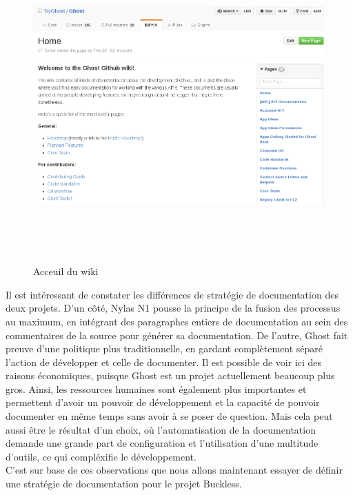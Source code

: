         \begin{figure}[h]
            \centering
            \includegraphics[height=12cm]{./assets/ghost3.png}
            \caption{Acceuil du wiki}
        \end{figure}

        Il est intéressant de constater les différences de stratégie de documentation des deux projets.
        D'un côté, Nylas N1 pousse la principe de la fusion des processus au maximum, en intégrant des
        paragraphes entiers de documentation au sein des commentaires de la source pour générer sa documentation.
        De l'autre, Ghost fait preuve d'une politique plus traditionnelle, en gardant complètement séparé
        l'action de développer et celle de documenter. Il est possible de voir ici des raisons économiques,
        puisque Ghost est un projet actuellement beaucoup plus gros. Ainsi, les ressources humaines sont
        également plus importantes et permettent d'avoir un pouvoir de développement et la capacité de
        pouvoir documenter en même temps sans avoir à se poser de question. Mais cela peut aussi être
        le résultat d'un choix, où l'automatisation de la documentation demande une grande part de
        configuration et l'utilisation d'une multitude d'outils, ce qui compléxifie le développement.\\
        C'est sur base de ces observations que nous allons maintenant essayer de définir une stratégie
        de documentation pour le projet Buckless.
